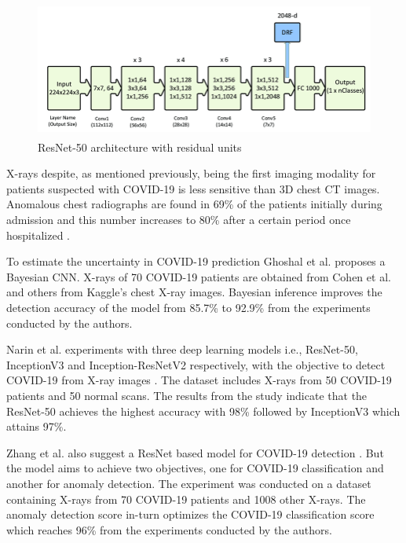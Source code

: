 \begin{figure}[H]
    \centering
    \includegraphics[width=15cm, height=4.5cm]{Images/ResNet.png}
    \decoRule
    \caption[ResNet-50 Architecture]{ResNet-50 architecture with residual units \cite{MOB+2020}}
    \label{fig:ResNet-50 Architecture}
    \end{figure}
\vspace{-2em}
X-rays despite, as mentioned previously, being the first imaging modality for 
patients suspected with COVID-19 is less sensitive than 3D chest CT images. 
Anomalous chest radiographs are found in 69\% of the patients initially during 
admission and this number increases to 80\% after a certain period 
once hospitalized \cite{WLA+2020}.

To estimate the uncertainty in COVID-19 prediction Ghoshal et al. \cite{GHT2020} proposes 
a Bayesian CNN. X-rays of 70 COVID-19 patients are obtained 
from Cohen et al. \cite{JMD2020} and others from Kaggle's chest X-ray images. Bayesian 
inference improves the detection accuracy of the model from 85.7\% to 92.9\% from 
the experiments conducted by the authors.

Narin et al. experiments with three deep learning models 
i.e., ResNet-50, InceptionV3 and Inception-ResNetV2 respectively, with the objective 
to detect COVID-19 from X-ray images  \cite{AKP2020}. The dataset includes X-rays from 50 COVID-19 patients and 50 normal scans.
 The results from the study indicate that the ResNet-50 achieves the highest accuracy with 98\% followed by InceptionV3 which 
attains 97\%.

Zhang et al. also suggest a ResNet based model for COVID-19 detection \cite{ZXS+2020}. 
But the model aims to achieve two objectives, one for COVID-19 classification and another for anomaly detection. The experiment was conducted on a dataset containing X-rays from 
70 COVID-19 patients and 1008 other X-rays. The anomaly detection score in-turn optimizes the COVID-19 
classification score which reaches 96\% from the experiments conducted by the authors.

